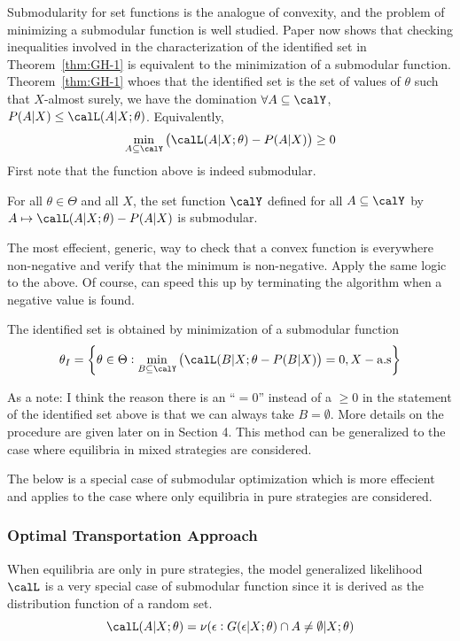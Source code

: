 Submodularity for set functions is the analogue of convexity, and the problem of minimizing a submodular function is well studied. Paper now shows that checking inequalities involved in the characterization of the identified set in Theorem~\ref{thm:GH-1} is equivalent to the minimization of a submodular function. Theorem~\ref{thm:GH-1} whoes that the identified set is the set of values of $\theta$ such that $X$-almost surely, we have the domination $\forall A\subseteq \calY$, $P(A|X) \leq \calL(A|X;\theta)$. Equivalently, 
\[\min_{A\subseteq\calY}\left(\calL(A|X;\theta) - P(A|X) \right) \geq 0\]
First note that the function above is indeed submodular.
\begin{lemma}
 	\label{lemma:GH-1}
	For all $\theta \in \Theta$ and all $X$, the set function $\calY$ defined for all $A\subseteq\calY$ by $A\mapsto \calL(A|X;\theta) - P(A|X)$ is submodular. 
\end{lemma}
 The most effecient, generic, way to check that a convex function is everywhere non-negative and verify that the minimum is non-negative. Apply the same logic to the above. Of course, can speed this up by terminating the algorithm when a negative value is found.

 \begin{theorem}
	\label{thm:GH-2}
	The identified set is obtained by minimization of a submodular function
	\[\theta_I = \left\{\theta \in \Theta: \min_{B\subseteq\calY} \left(\calL(B|X;\theta - P(B|X)\right)= 0, X-\text{a.s}\right\}\] 	
 \end{theorem}

As a note: I think the reason there is an ``$=0$'' instead of a $\geq 0$ in the statement of the identified set above is that we can always take $B=\emptyset$. More details on the procedure are given later on in Section 4. This method can be generalized to the case where equilibria in mixed strategies are considered.

The below is a special case of submodular optimization which is more effecient and applies to the case where only equilibria in pure strategies are considered.

\subsubsection{Optimal Transportation Approach}

When equilibria are only in pure strategies, the model generalized likelihood $\calL$ is a very special case of submodular function since it is derived as the distribution function of a random set. 
\[\calL(A|X;\theta) = \nu(\epsilon: G(\epsilon | X;\theta) \cap A \neq \emptyset| X;\theta)\]

